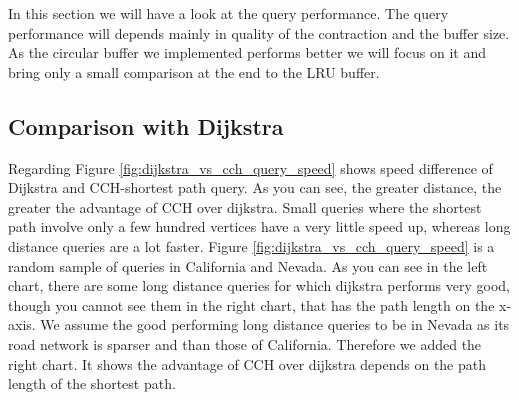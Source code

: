 In this section we will have a look at the query performance. The query performance will depends mainly in quality of the contraction and the buffer size. 
As the circular buffer we implemented performs better we will focus on it and bring only a small comparison at the end to the LRU buffer.


\subsection{Comparison with Dijkstra}

Regarding Figure \ref{fig:dijkstra_vs_cch_query_speed} shows speed difference of Dijkstra and CCH-shortest path query. As you can see, the greater distance, the greater the advantage of CCH over dijkstra. Small queries where the shortest path involve only a few hundred vertices have a very little speed up,
whereas long distance queries are a lot faster. Figure \ref{fig:dijkstra_vs_cch_query_speed} is a random sample of queries in California and Nevada. As you can
see in the left chart, there are some long distance queries for which dijkstra performs very good, though you cannot see them in the right chart, that has the path 
length on the x-axis. We assume the good performing long distance queries to be in Nevada as its road network is sparser and than those of California. Therefore we added the right chart.
It shows the advantage of CCH over dijkstra depends on the path length of the shortest path.


